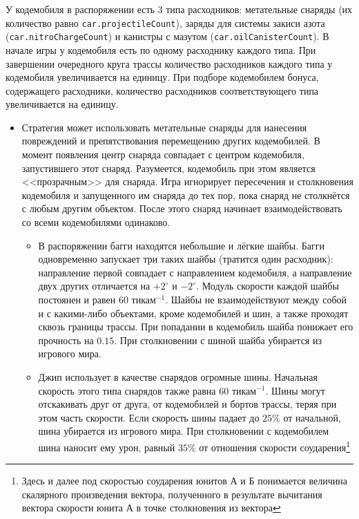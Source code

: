 У кодемобиля в распоряжении есть $3$ типа расходников: метательные снаряды (их количество равно \texttt{car.projectileCount}), заряды для
системы закиси азота (\texttt{car.nitroChargeCount}) и канистры с мазутом (\texttt{car.oilCanisterCount}). В начале игры у кодемобиля есть
по одному расходнику каждого типа. При завершении очередного круга трассы количество расходников каждого типа у кодемобиля увеличивается на
единицу. При подборе кодемобилем бонуса, содержащего расходники, количество расходников соответствующего типа увеличивается на единицу.

\begin{itemize}
  \item Стратегия может использовать метательные снаряды для нанесения повреждений и препятствования перемещению других кодемобилей. В
        момент появления центр снаряда совпадает с центром кодемобиля, запустившего этот снаряд. Разумеется, кодемобиль при этом является
        <<прозрачным>> для снаряда. Игра игнорирует пересечения и столкновения кодемобиля и запущенного им снаряда до тех пор, пока снаряд
        не столкнётся с любым другим объектом. После этого снаряд начинает взаимодействовать со всеми кодемобилями одинаково.
        \begin{itemize}
          \item В распоряжении багги находятся небольшие и лёгкие шайбы. Багги одновременно запускает три таких шайбы (тратится один
                расходник): направление первой совпадает с направлением кодемобиля, а направление двух других отличается на $+2^\circ$ и
                $-2^\circ$. Модуль скорости каждой шайбы постоянен и равен $60$ тикам$^{-1}$. Шайбы не взаимодействуют между собой и с
                какими-либо объектами, кроме кодемобилей и шин, а также проходят сквозь границы трассы. При попадании в кодемобиль шайба
                понижает его прочность на $0.15$. При столкновении с шиной шайба убирается из игрового мира.
          \item Джип использует в качестве снарядов огромные шины. Начальная скорость этого типа снарядов также равна $60$ тикам$^{-1}$.
                Шины могут отскакивать друг от друга, от кодемобилей и бортов трассы, теряя при этом часть скорости. Если скорость шины
                падает до $25\%$ от начальной, шина убирается из игрового мира. При столкновении с кодемобилем шина наносит ему урон, равный
                $35\%$ от отношения скорости соударения\footnote[2]{Здесь и далее под скоростью соударения юнитов А и Б понимается величина
                скалярного произведения вектора, полученного в результате вычитания вектора скорости юнита А в точке столкновения из вектора
}
\end{itemize}
\end{itemize}
